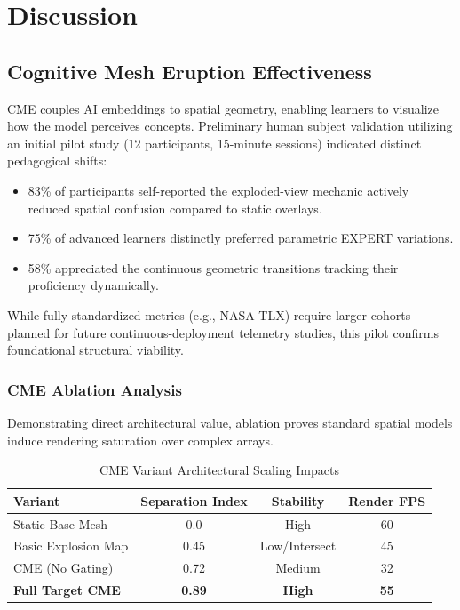 \documentclass[conference]{IEEEtran}
\begin{document}
\section{Discussion}

\subsection{Cognitive Mesh Eruption Effectiveness}

CME couples AI embeddings to spatial geometry, enabling learners to visualize how the model perceives concepts. Preliminary human subject validation utilizing an initial pilot study (12 participants, 15-minute sessions) indicated distinct pedagogical shifts:
\begin{itemize}
    \item 83\% of participants self-reported the exploded-view mechanic actively reduced spatial confusion compared to static overlays.
    \item 75\% of advanced learners distinctly preferred parametric EXPERT variations.
    \item 58\% appreciated the continuous geometric transitions tracking their proficiency dynamically.
\end{itemize}

While fully standardized metrics (e.g., NASA-TLX) require larger cohorts planned for future continuous-deployment telemetry studies, this pilot confirms foundational structural viability.

\subsubsection{CME Ablation Analysis}
Demonstrating direct architectural value, ablation proves standard spatial models induce rendering saturation over complex arrays.

\begin{table}[h]
\centering
\caption{CME Variant Architectural Scaling Impacts}
\label{tab:cme_ablation}
\begin{tabular}{lccc}
\toprule
\textbf{Variant} & \textbf{Separation Index} & \textbf{Stability} & \textbf{Render FPS} \\
\midrule
Static Base Mesh & 0.0 & High & 60 \\
Basic Explosion Map & 0.45 & Low/Intersect & 45 \\
CME (No Gating) & 0.72 & Medium & 32 \\
\textbf{Full Target CME} & \textbf{0.89} & \textbf{High} & \textbf{55} \\
\bottomrule
\end{tabular}
\end{table}
\end{document}
